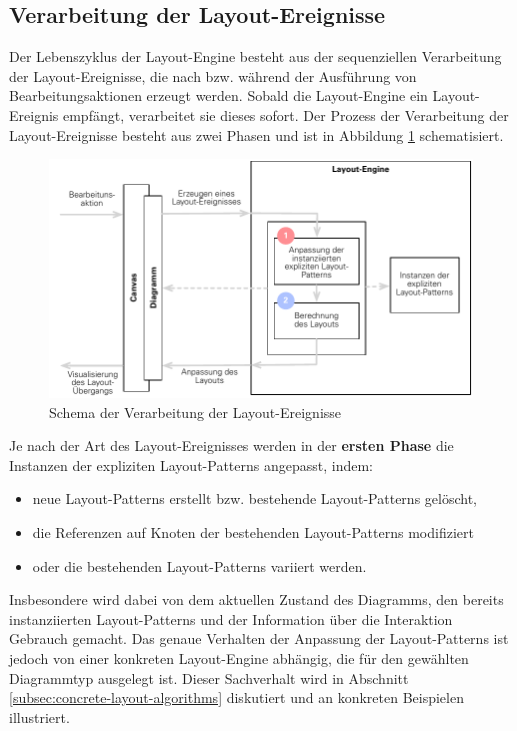 \subsection{Verarbeitung der Layout-Ereignisse}
\label{subsec:processing-of-layout-events}

Der Lebenszyklus der Layout-Engine besteht aus der sequenziellen Verarbeitung der Layout-Ereignisse, die nach bzw. während der Ausführung von Bearbeitungsaktionen erzeugt werden. Sobald die Layout-Engine ein Layout-Ereignis empfängt, verarbeitet sie dieses sofort. Der Prozess der Verarbeitung der Layout-Ereignisse besteht aus zwei Phasen und ist in Abbildung \ref{fig:processing-of-layout-events} schematisiert.

\begin{figure}[hbt]
    \centering
    \includegraphics[width=\textwidth]{resources/processing-of-layout-events}
    \caption{Schema der Verarbeitung der Layout-Ereignisse}
    \label{fig:processing-of-layout-events}
\end{figure}

Je nach der Art des Layout-Ereignisses werden in der \textbf{ersten Phase} die Instanzen der expliziten Layout-Patterns angepasst, indem:

\begin{itemize}
    \item neue Layout-Patterns erstellt bzw. bestehende  Layout-Patterns gelöscht,
    \item die Referenzen auf Knoten der bestehenden Layout-Patterns modifiziert
    \item oder die bestehenden Layout-Patterns variiert werden.
\end{itemize}

Insbesondere wird dabei von dem aktuellen Zustand des Diagramms, den bereits instanziierten Layout-Patterns und der Information über die Interaktion Gebrauch gemacht. Das genaue Verhalten der Anpassung der Layout-Patterns ist jedoch von einer konkreten Layout-Engine abhängig, die für den gewählten Diagrammtyp ausgelegt ist. Dieser Sachverhalt wird in Abschnitt \ref{subsec:concrete-layout-algorithms} diskutiert und an konkreten Beispielen illustriert.

